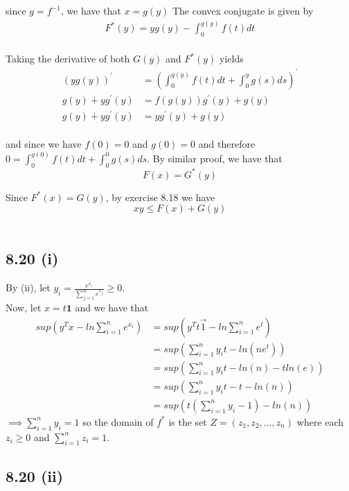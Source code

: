 \documentclass[letterpaper,12pt]{article}
\theoremstyle{definition}
\begin{document}
since $g = f^{-1}$, we have that $x=g(y)$ The convex conjugate is given by \\

\begin{align*}
F^*(y)=yg(y)-\int_0^{g(y)} f(t)dt
\end{align*}\\

Taking the derivative of both $G(y)$ and $F^*(y)$ yields
\begin{align*}
\left( yg(y) \right)^{'} &= \left( \int_0^{g(y)} f(t)dt + \int_0^{y} g(s)ds \right)^{'} \\
g(y) + yg^{'}(y) &= f(g(y))g^{'}(y) + g(y)\\
g(y)+yg^{'}(y) &= yg^{'}(y) +g(y)
\end{align*} \\


and since we have $f(0)=0$ and $g(0)=0$ and therefore $0= \int_0^{g(0)} f(t)dt + \int_0^0 g(s)ds$. 
By similar proof, we have that \[F(x) = G^*(y)\]

Since $F^*(x) = G(y)$, by exercise 8.18 we have\\

\begin{equation}
xy \leq F(x) + G(y) 
\end{equation}\\


\subsection*{8.20 (i)}

By (ii), let $y_i=\frac{e^{x_i}}{\sum_{j=1}^ne^{x_j}}\ge 0$.\\
Now, let $x=t\mathbf{1}$ and we have that
\begin{align*}
sup(y^Tx-ln\sum_{i=1}^ne^{x_i})&=sup(y^Tt\vec{1}-ln\sum_{i=1}^ne^t)\\
&=sup(\sum_{i=1}^ny_it-ln(ne^t))\\
&=sup(\sum_{i=1}^ny_it-ln(n) - tln(e))\\
&=sup(\sum_{i=1}^ny_it-t-ln(n))\\
&=sup(t(\sum_{i=1}^ny_i-1)-ln(n))
\end{align*}
 $\implies \displaystyle\sum_{i=1}^ny_i=1$ so the domain of $f^*$ is the set $Z=(z_1,z_2,...,z_n)$ where each $z_i \ge 0$ and $\sum_{i=1}^nz_i=1$.

\subsection*{8.20 (ii)}
\end{document}
